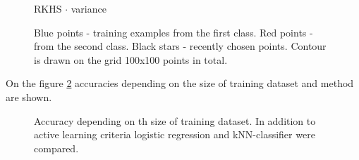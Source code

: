 \documentclass[a4paper]{article}
\begin{document}
\begin{figure}[h]
\begin{minipage}[h]{0.49\linewidth}
\end{minipage}
\hfill
\begin{minipage}[h]{0.49\linewidth}
 RKHS $\cdot$ variance
\end{minipage}

\caption{Blue points - training examples from the first class. Red points - from the second class. Black stars - recently chosen points. Contour is drawn on the grid 100x100 points in total.}
\label{contour_plots}
\end{figure}

\clearpage
On the figure \ref{accBlobs} accuracies depending on the size of training dataset and method are shown.

\begin{figure}[h]
\caption{Accuracy depending on th size of training dataset. In addition to active learning criteria logistic regression and kNN-classifier were compared.}
\label{accBlobs}
\end{figure}
\end{document}
